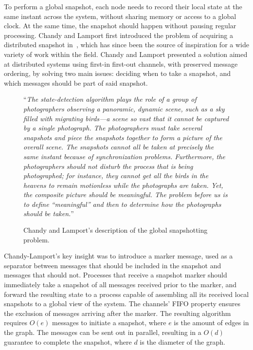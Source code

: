 To perform a global snapshot, each node needs to record their local state at the
same instant across the system, without sharing memory or access to a global
clock. At the same time, the snapshot should happen without pausing regular
processing. Chandy and Lamport first introduced the problem of acquiring a
distributed snapshot in~\cite{chandy-lamport}, which has since been the source
of inspiration for a wide variety of work within the field. Chandy and Lamport
presented a solution aimed at distributed systems using first-in first-out
channels, with preserved message ordering, by solving two main issues: deciding
when to take a snapshot, and which messages should be part of said snapshot.

\begin{figure}[H]
  \begin{displayquote}
    ``\textit{The state-detection algorithm plays the role of a group of
      photographers observing a panoramic, dynamic scene, such as a sky filled
      with migrating birds---a scene so vast that it cannot be captured by a
      single photograph. The photographers must take several snapshots and piece
      the snapshots together to form a picture of the overall scene. The snapshots
      cannot all be taken at precisely the same instant because of synchronization
      problems. Furthermore, the photographers should not disturb the process that
      is being photographed; for instance, they cannot get all the birds in the
      heavens to remain motionless while the photographs are taken. Yet, the
      composite picture should be meaningful. The problem before us is to define
    “meaningful” and then to determine how the photographs should be taken.}''
  \end{displayquote}

  \captionsetup{labelformat=empty}
  \caption{Chandy and Lamport's description of the global snapshotting problem.}
\end{figure}

Chandy-Lamport's key insight was to introduce a marker message, used as a
separator between messages that should be included in the snapshot and messages
that should not. Processes that receive a snapshot marker should immediately
take a snapshot of all messages received prior to the marker, and forward the
resulting state to a process capable of assembling all its received local
snapshots to a global view of the system. The channels' FIFO property ensures
the exclusion of messages arriving after the marker. The resulting algorithm
requires $ O(e) $ messages to initiate a snapshot, where $ e $ is the amount of
edges in the graph. The messages can be sent out in parallel, resulting in a $
O(d) $ guarantee to complete the snapshot, where $ d $ is the diameter of the
graph.

